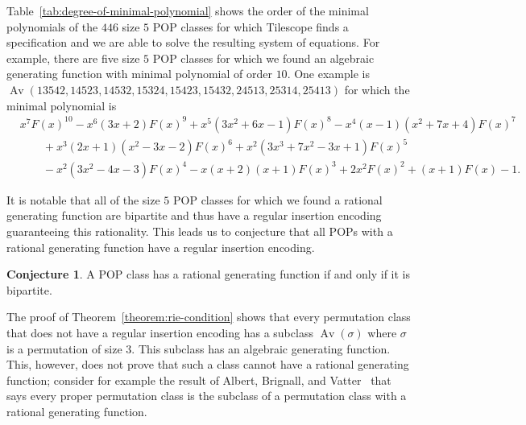 \documentclass[11pt]{article}
\theoremstyle{definition}
\newtheorem{conjecture}[theorem]{Conjecture}
\numberwithin{theorem}{section}
\numberwithin{question}{section}
\numberwithin{definition}{section}
\numberwithin{example}{section}
\numberwithin{remark}{section}
\newcommand{\Av}{\operatorname{Av}}
\begin{document}
Table~\ref{tab:degree-of-minimal-polynomial} shows the order of the minimal polynomials of the $446$ size $5$ POP classes for which Tilescope finds a specification and we are able to solve the resulting system of equations. For example, there are five size $5$ POP classes for which we found an algebraic generating function with minimal polynomial of order $10$. One example is $\Av(13542, \allowbreak 14523, \allowbreak 14532, \allowbreak 15324, \allowbreak 15423, \allowbreak 15432, \allowbreak 24513, \allowbreak 25314, \allowbreak 25413)$ for which the minimal polynomial is
\begin{align*}
	 & x^{7} F \left(x
	\right)^{10}-x^{6} \left(3 x +2\right) F \left(x
	\right)^{9}+x^{5} \left(3 x^{2}+6 x -1\right) F \left(x
	\right)^{8}-x^{4} \left(x -1\right) \left(x^{2}+7 x +4\right) F \left(x
	\right)^{7}                                                              \\
	 & \qquad +x^{3} \left(2 x +1\right) \left(x^{2}-3 x -2\right) F \left(x
	\right)^{6}+x^{2} \left(3 x^{3}+7 x^{2}-3 x +1\right) F \left(x
	\right)^{5}                                                              \\
	 & \qquad -x^{2} \left(3 x^{2}-4 x -3\right) F \left(x
	\right)^{4} -x \left(x +2\right) \left(x +1\right) F \left(x
	\right)^{3}+2 x^{2} F \left(x
	\right)^{2}+\left(x +1\right) F \! \left(x \right)-1.
\end{align*}

It is notable that all of the size $5$ POP classes for which we found a rational generating function are bipartite and thus have a regular insertion encoding guaranteeing this rationality. This leads us to conjecture that all POPs with a rational generating function have a regular insertion encoding.

\begin{conjecture}
	A POP class has a rational generating function if and only if it is bipartite.
\end{conjecture}

The proof of Theorem~\ref{theorem:rie-condition} shows that every permutation class that does not have a regular insertion encoding has a subclass $\Av(\sigma)$ where $\sigma$ is a permutation of size $3$. This subclass has an algebraic generating function. This, however, does not prove that such a class cannot have a rational generating function; consider for example the result of Albert, Brignall, and Vatter~\cite{albert:large-infinite-antichains} that says every proper permutation class is the subclass of a permutation class with a rational generating function.
\end{document}
